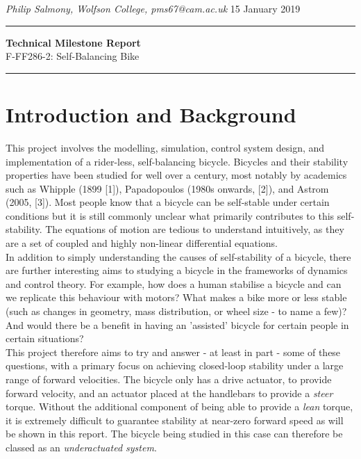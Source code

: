 \documentclass[12pt]{article}
\begin{document}
	\noindent \textit{Philip Salmony, Wolfson College, pms67@cam.ac.uk} \hfill 15 January 2019

	\vspace{0.25cm}

	\begin{center}
		\hrule \vspace{0.3cm} \huge{\textbf{Technical Milestone Report}}  \\
		\Large{F-FF286-2: Self-Balancing Bike} \\
		\vspace{0.2cm}
		\hrule
	\end{center}
	
\vspace{0.2cm}	
	
\section{Introduction and Background}
This project involves the modelling, simulation, control system design, and implementation of a rider-less, self-balancing bicycle. Bicycles and their stability properties have been studied for well over a century, most notably by academics such as Whipple (1899 [1]), Papadopoulos (1980s onwards, [2]), and Astrom (2005, [3]). Most people know that a bicycle can be self-stable under certain conditions but it is still commonly unclear what primarily contributes to this self-stability. The equations of motion are tedious to understand intuitively, as they are a set of coupled and highly non-linear differential equations. \\

\noindent In addition to simply understanding the causes of self-stability of a bicycle, there are further interesting aims to studying a bicycle in the frameworks of dynamics and control theory. For example, how does a human stabilise a bicycle and can we replicate this behaviour with motors? What makes a bike more or less stable (such as changes in geometry, mass distribution, or wheel size - to name a few)? And would there be a benefit in having an 'assisted' bicycle for certain people in certain situations? \\

\noindent This project therefore aims to try and answer - at least in part - some of these questions, with a primary focus on achieving closed-loop stability under a large range of forward velocities. The bicycle only has a drive actuator, to provide forward velocity, and an actuator placed at the handlebars to provide a \textit{steer} torque. Without the additional component of being able to provide a \textit{lean} torque, it is extremely difficult to guarantee stability at near-zero forward speed as will be shown in this report. The bicycle being studied in this case can therefore be classed as an \textit{underactuated system}. \\
\end{document}
